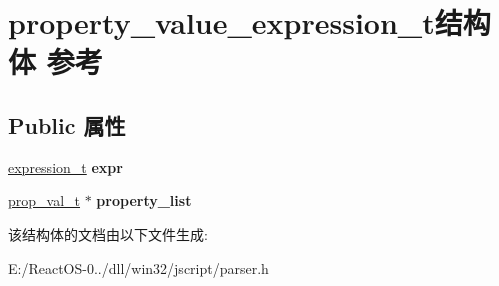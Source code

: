\hypertarget{structproperty__value__expression__t}{}\section{property\+\_\+value\+\_\+expression\+\_\+t结构体 参考}
\label{structproperty__value__expression__t}
\subsection*{Public 属性}
\begin{DoxyCompactItemize}
\item 
\mbox{\label{structproperty__value__expression__t_a3fe71e59be3a5b2fcae13e8440f54190}} 
\hyperlink{struct__expression__t}{expression\+\_\+t} {\bfseries expr}
\item 
\mbox{\label{structproperty__value__expression__t_acc6273eca0b6db0799e4a7391c927d35}} 
\hyperlink{struct__prop__val__t}{prop\+\_\+val\+\_\+t} $\ast$ {\bfseries property\+\_\+list}
\end{DoxyCompactItemize}


该结构体的文档由以下文件生成\+:\begin{DoxyCompactItemize}
\item 
E\+:/\+React\+O\+S-\/0../dll/win32/jscript/parser.\+h\end{DoxyCompactItemize}
